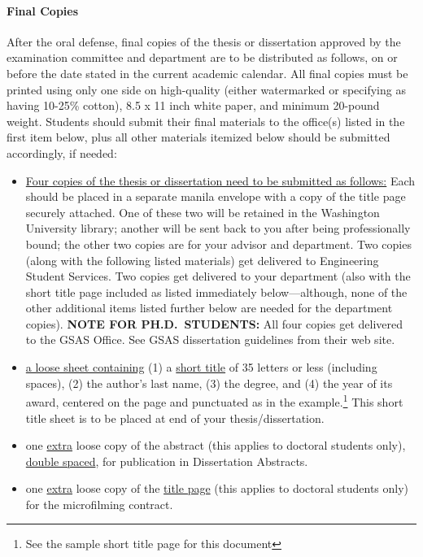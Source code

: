 \paragraph{Final Copies}
After the oral defense, final copies of the thesis or dissertation approved by
the examination committee and department are to be distributed as follows, on
or before the date stated in the current academic calendar.  All final copies
must be printed using only one side on high-quality (either watermarked or
specifying as having 10-25\% cotton), 8.5 x 11 inch white paper, and minimum
20-pound weight.  Students should submit their final materials to the office(s)
listed in the first item below, plus all other materials itemized below should
be submitted accordingly, if needed:
\begin{itemize}
  \item \uline{Four copies of the thesis or dissertation need to be submitted
	  as follows:} Each should be placed in a separate manila envelope with
	  a copy of the title page securely attached.  One of these two will be
	  retained in the Washington University library; another will be sent
	  back to you after being professionally bound;  the other two copies
	  are for your advisor and department.  Two copies (along with the
	  following listed materials) get delivered to Engineering Student
	  Services.  Two copies get delivered to your department (also with the
	  short title page included as listed immediately below---although,
	  none of the other additional items listed further below are needed
	  for the department copies).  \textbf{NOTE FOR PH.D.\ STUDENTS:}  All
	  four copies get delivered to the GSAS Office.  See GSAS dissertation
	  guidelines from their web site.
        
  \item \uline{a loose sheet containing} (1) a \uline{short title} of 35
	  letters or less (including spaces), (2) the author's last name, (3)
	  the degree, and (4) the year of its award, centered on the page and
	  punctuated as in the example.\footnote{See the sample short title
	  page for this document} This short title sheet is to be placed at end
	  of your thesis/dissertation.
	
  \item one \uline{extra} loose copy of the abstract (this applies to doctoral
	  students only), \uline{double spaced}, for publication in
	  Dissertation Abstracts. 
  
  \item one \uline{extra} loose copy of the \uline{title page} (this applies to
	  doctoral students only) for the microfilming contract.


\end{itemize}
